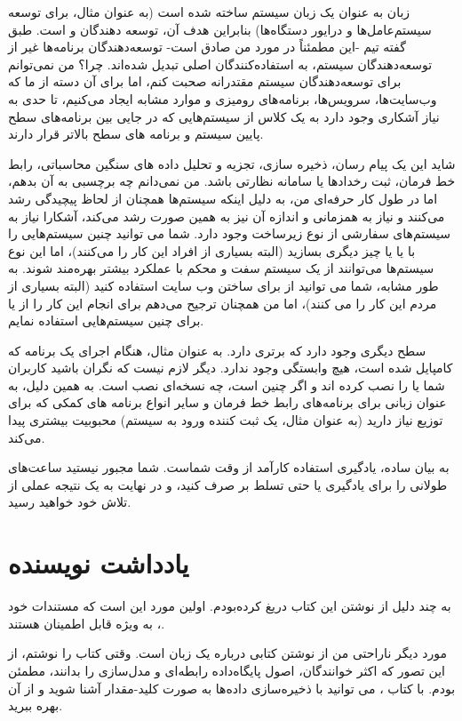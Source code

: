 \documentclass{book}
\begin{document}
زبان   به عنوان یک زبان سیستم ساخته شده است (به عنوان مثال، برای توسعه سیستم‌عامل‌ها و درایور دستگاه‌ها) بنابراین هدف آن، توسعه دهندگان  و   است. طبق گفته تیم -این مطمئناً در مورد من صادق است- توسعه‌دهندگان برنامه‌ها غیر از  توسعه‌دهندگان سیستم، به استفاده‌کنندگان اصلی  تبدیل شده‌اند. چرا؟ من نمی‌توانم برای توسعه‌دهندگان سیستم مقتدرانه صحبت کنم، اما برای آن دسته از ما که وب‌سایت‌ها، سرویس‌ها، برنامه‌های رومیزی و موارد مشابه ایجاد می‌کنیم، تا حدی به نیاز آشکاری وجود دارد به یک کلاس از سیستم‌هایی که در جایی بین برنامه‌های سطح پایین سیستم و برنامه های سطح بالاتر قرار دارند.

شاید این یک پیام رسان، ذخیره سازی، تجزیه و تحلیل داده های سنگین محاسباتی، رابط خط فرمان، ثبت رخداد‌ها یا سامانه نظارتی باشد. من نمی‌دانم چه برچسبی به آن بدهم، اما در طول کار حرفه‌ای من، به دلیل اینکه سیستم‌ها همچنان از لحاظ پیچیدگی رشد می‌کنند و نیاز به همزمانی و اندازه آن  نیز به همین صورت رشد می‌کند، آشکارا نیاز به سیستم‌های سفارشی از نوع زیرساخت وجود دارد. شما می توانید چنین سیستم‌هایی را با  یا  یا چیز دیگری بسازید (البته بسیاری از افراد این کار را می‌کنند)، اما این نوع سیستم‌ها می‌توانند از یک سیستم سفت و محکم با عملکرد بیشتر بهره‌مند شوند. به طور مشابه، شما می توانید از  برای ساختن وب سایت استفاده کنید (البته بسیاری از مردم این کار را می کنند)، اما من همچنان ترجیح می‌دهم برای انجام این کار را از   یا  برای چنین سیستم‌هایی استفاده نمایم.

سطح دیگری وجود دارد که  برتری دارد. به عنوان مثال، هنگام اجرای یک برنامه  که کامپایل شده است، هیچ وابستگی وجود ندارد. دیگر لازم نیست که نگران باشید کاربران شما  یا  را نصب کرده اند و اگر چنین است، چه نسخه‌ای نصب است. به همین دلیل،  به عنوان زبانی برای برنامه‌های رابط خط فرمان و سایر انواع برنامه های کمکی که برای توزیع نیاز دارید (به عنوان مثال، یک ثبت کننده ورود به سیستم) محبوبیت بیشتری پیدا می‌کند.

به بیان ساده، یادگیری  استفاده کارآمد از وقت شماست. شما مجبور نیستید ساعت‌های طولانی را برای یادگیری یا حتی تسلط بر  صرف کنید، و در نهایت به یک نتیجه عملی از تلاش خود خواهید رسید.
\newpage
\section{یادداشت نویسنده}
به چند دلیل از نوشتن این کتاب دریغ کرده‌بودم. اولین مورد این است که مستندات خود ، به ویژه
 قابل اطمینان  هستند.
 
 مورد دیگر ناراحتی من از نوشتن کتابی درباره یک زبان است. وقتی کتاب را نوشتم، از این تصور که اکثر خوانندگان، اصول پایگاه‌داده رابطه‌ای و مدل‌سازی را بدانند، مطمئن بودم.  با کتاب ، می توانید با ذخیره‌سازی داده‌ها به صورت کلید-مقدار  آشنا شوید و از  آن بهره ببرید. 
  
\end{document}
